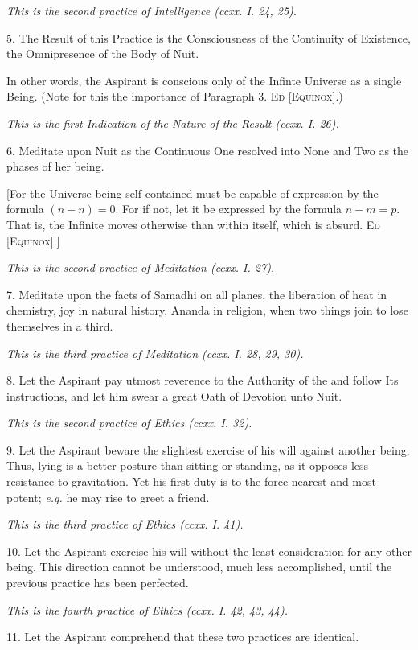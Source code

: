 \textit{This is the second practice of Intelligence (ccxx. I. 24, 25).}

5. The Result of this Practice is the Consciousness of the Continuity of Existence, the Omnipresence of the Body of Nuit.

In other words, the Aspirant is conscious only of the Infinte Universe as a single Being. (Note for this the importance of Paragraph 3. \textsc{Ed [Equinox]}.)

\textit{This is the first Indication of the Nature of the Result (ccxx. I. 26).}

6. Meditate upon Nuit as the Continuous One resolved into None and Two as the phases of her being.

[For the Universe being self-contained must be capable of expression by the formula $(n-n)=0$. For if not, let it be expressed by the formula $n-m=p$. That is, the Infinite moves otherwise than within itself, which is absurd. \textsc{Ed [Equinox]}.]

\textit{This is the second practice of Meditation (ccxx. I. 27).}

7. Meditate upon the facts of Samadhi on all planes, the liberation of heat in chemistry, joy in natural history, Ananda in religion, when two things join to lose themselves in a third.

\textit{This is the third practice of Meditation (ccxx. I. 28, 29, 30).}

8. Let the Aspirant pay utmost reverence to the Authority of the \Argentium{} and follow Its instructions, and let him swear a great Oath of Devotion unto Nuit.

\textit{This is the second practice of Ethics (ccxx. I. 32).}

9. Let the Aspirant beware the slightest exercise of his will against another being. Thus, lying is a better posture than sitting or standing, as it opposes less resistance to gravitation. Yet his first duty is to the force nearest and most potent; \textit{e.g.} he may rise to greet a friend.

\textit{This is the third practice of Ethics (ccxx. I. 41).}

10. Let the Aspirant exercise his will without the least consideration for any other being. This direction cannot be understood, much less accomplished, until the previous practice has been perfected.

\textit{This is the fourth practice of Ethics (ccxx. I. 42, 43, 44).}

11. Let the Aspirant comprehend that these two practices are identical.

